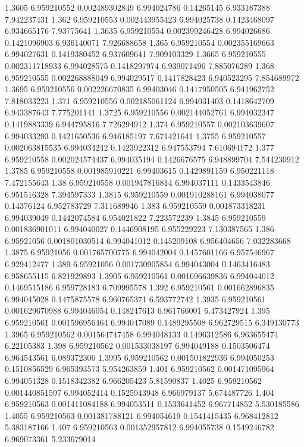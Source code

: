 {1.3605 6.959210552 0.002489302849 6.994024786 0.14265145 6.933187388 7.942237431
1.362 6.959210553 0.002443955423 6.994025738 0.1423468097 6.934665176 7.93775641
1.3635 6.959210554 0.002399246428 6.994026686 0.1421096903 6.936140071 7.926688658
1.365 6.959210554 0.002355169663 6.994027631 0.1419380452 6.937609641 7.909103329
1.3665 6.959210555 0.002311718933 6.994028575 0.1418297974 6.939071496 7.885076289
1.368 6.959210555 0.002268888049 6.994029517 0.1417828423 6.940523295 7.854689972
1.3695 6.959210556 0.002226670835 6.99403046 0.1417950505 6.941962752 7.818033223
1.371 6.959210556 0.002185061124 6.994031403 0.1418642709 6.943387643 7.775201141
1.3725 6.959210556 0.002144052761 6.994032347 0.1419883339 6.944795816 7.726294912
1.374 6.959210557 0.002103639607 6.994033293 0.1421650536 6.946185197 7.671421641
1.3755 6.959210557 0.002063815535 6.994034242 0.1423922312 6.947553794 7.610694172
1.377 6.959210558 0.002024574437 6.994035194 0.1426676575 6.948899704 7.544230912
1.3785 6.959210558 0.001985910221 6.99403615 0.1429891159 6.950221118 7.472155643
1.38 6.959210558 0.001947816814 6.994037111 0.1433543846 6.951516328 7.394597333
1.3815 6.959210559 0.001910288161 6.994038077 0.14376124 6.952783729 7.311689946
1.383 6.959210559 0.001873318231 6.994039049 0.1442074584 6.954021822 7.223572239
1.3845 6.959210559 0.001836901011 6.994040027 0.1446908195 6.955229223 7.130387565
1.386 6.95921056 0.001801030514 6.994041012 0.145209108 6.956404656 7.032283668
1.3875 6.95921056 0.001765700775 6.994042004 0.1457601166 6.957546967 6.929412477
1.389 6.95921056 0.001730905854 6.994043004 0.1463416483 6.958655115 6.821929893
1.3905 6.959210561 0.001696639836 6.994044012 0.1469515186 6.959728183 6.709995578
1.392 6.959210561 0.001662896835 6.994045028 0.1475875578 6.960765371 6.593772742
1.3935 6.959210561 0.001629670988 6.994046054 0.148247613 6.961766001 6.473427924
1.395 6.959210561 0.001596956464 6.994047089 0.1489295508 6.962729515 6.349130773
1.3965 6.959210562 0.001564747458 6.994048133 0.1496312586 6.963655474 6.22105383
1.398 6.959210562 0.001533038197 6.994049188 0.1503506474 6.964543561 6.089372306
1.3995 6.959210562 0.001501822936 6.994050253 0.1510856529 6.965393573 5.954263859
1.401 6.959210562 0.001471095964 6.994051328 0.1518342382 6.966205423 5.81590837
1.4025 6.959210562 0.001440851597 6.994052414 0.1525943948 6.966979137 5.674487726
1.404 6.959210563 0.001411084188 6.994053511 0.1533641452 6.967714852 5.530185586
1.4055 6.959210563 0.001381788121 6.994054619 0.1541415435 6.968412812 5.383187166
1.407 6.959210563 0.001352957812 6.994055738 0.1549246782 6.969073361 5.233679014
}

